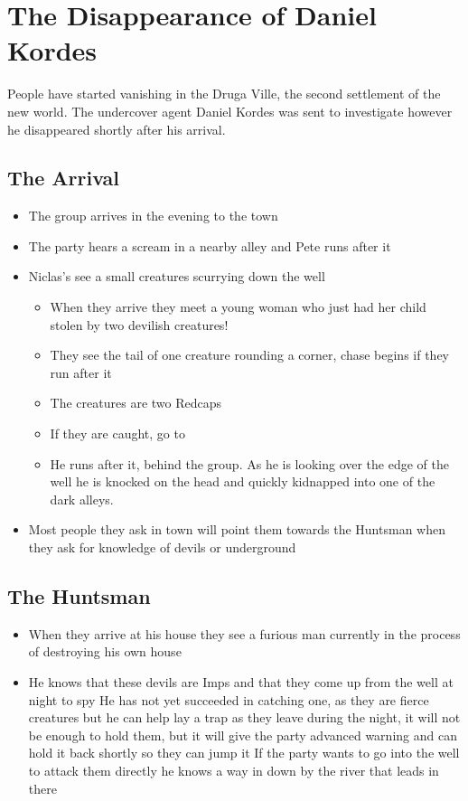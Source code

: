 \section*{The Disappearance of Daniel Kordes}
People have started vanishing in the Druga Ville, the second settlement of the new world. The undercover agent Daniel Kordes was sent to investigate however he disappeared shortly after his arrival. 

\subsection*{The Arrival}
\begin{itemize}
    \item The group arrives in the evening to the town
    \item The party hears a scream in a nearby alley and Pete runs after it 
    \item Niclas's see a small creatures scurrying down the well
    \begin{itemize}
        \item When they arrive they meet a young woman who just had her child stolen by two devilish creatures!
        \item They see the tail of one creature rounding a corner, chase begins if they run after it
        \item The creatures are two Redcaps
        \item If they are caught, go to 
    \end{itemize}
    \begin{itemize}
        \item He runs after it, behind the group. As he is looking over the edge of the well he is knocked on the head and quickly kidnapped into one of the dark alleys.
    \end{itemize}
    \item Most people they ask in town will point them towards the Huntsman when they ask for knowledge of devils or underground
\end{itemize}

\subsection*{The Huntsman}
\begin{itemize}
    \item When they arrive at his house they see a furious man currently in the process of destroying his own house
    \item He knows that these devils are Imps and that they come up from the well at night to spy
        He has not yet succeeded in catching one, as they are fierce creatures but he can help lay a trap as they leave during the night, it will not be enough to hold them, but it will give the party advanced warning and can hold it back shortly so they can jump it
    If the party wants to go into the well to attack them directly he knows a way in down by the river that leads in there
\end{itemize}

